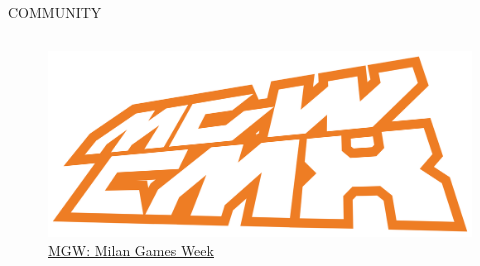 \documentclass[aspectratio=1610]{beamer}
\begin{document}
\begin{frame}{COMMUNITY}
    \begin{columns}
        \column{\textwidth}
        \begin{figure}
            \includegraphics[width=\linewidth]{img/mgw.png}
            \caption{\href{https://www.youtube.com/watch?v=OKoTHn0xw3U}{MGW: Milan Games Week}}
        \end{figure}
    \end{columns}
\end{frame}
\end{document}
